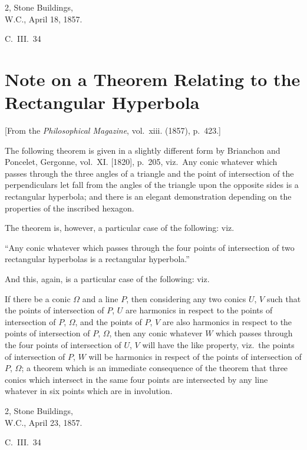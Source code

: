 \documentclass[11pt,a4paper]{book}
\begin{document}
\begin{flushright}
2, Stone Buildings,\\
W.C., April 18, 1857.
\end{flushright}
\hfill C.~III.~34
\newpage


\section{Note on a Theorem Relating to the Rectangular Hyperbola}
\label{sec:206}

[From the \textit{Philosophical Magazine}, vol.~xiii. (1857), p.~423.]
\vspace{1em}

The following theorem is given in a slightly different form by Brianchon and Poncelet, Gergonne, vol.~XI. [1820], p.~205, viz.\ Any conic whatever which passes through the three angles of a triangle and the point of intersection of the perpendiculars let fall from the angles of the triangle upon the opposite sides is a rectangular hyperbola; and there is an elegant demonstration depending on the properties of the inscribed hexagon.

The theorem is, however, a particular case of the following: viz.

``Any conic whatever which passes through the four points of intersection of two rectangular hyperbolas is a rectangular hyperbola.''

And this, again, is a particular case of the following: viz.

If there be a conic $\Omega$ and a line $P$, then considering any two conics $U$, $V$ such that the points of intersection of $P$, $U$ are harmonics in respect to the points of intersection of $P$, $\Omega$, and the points of $P$, $V$ are also harmonics in respect to the points of intersection of $P$, $\Omega$, then any conic whatever $W$ which passes through the four points of intersection of $U$, $V$ will have the like property, viz.\ the points of intersection of $P$, $W$ will be harmonics in respect of the points of intersection of $P$, $\Omega$; a theorem which is an immediate consequence of the theorem that three conics which intersect in the same four points are intersected by any line whatever in six points which are in involution.

\begin{flushright}
2, Stone Buildings,\\
W.C., April 23, 1857.
\end{flushright}
\hfill C.~III.~34
\newpage
\end{document}
